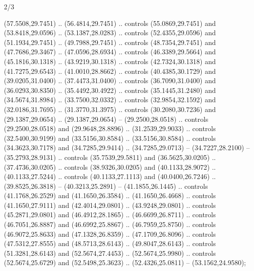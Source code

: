 \begin{flagdescription}{2/3}
\begin{scope}[xshift=0.3333\flaglength,yshift=0.5\flagwidth,scale=\flagwidth/711.3]
\begin{scope}
    (57.5508,29.7451) .. (56.4814,29.7451) .. controls (55.0869,29.7451) and
    (53.8418,29.0596) .. (53.1387,28.0283) .. controls (52.4355,29.0596) and
    (51.1934,29.7451) .. (49.7988,29.7451) .. controls (48.7354,29.7451) and
    (47.7686,29.3467) .. (47.0596,28.6934) .. controls (46.3389,29.5664) and
    (45.1816,30.1318) .. (43.9219,30.1318) .. controls (42.7324,30.1318) and
    (41.7275,29.6543) .. (41.0010,28.8662) .. controls (40.4385,30.1729) and
    (39.0205,31.0400) .. (37.4473,31.0400) .. controls (36.7090,31.0400) and
    (36.0293,30.8350) .. (35.4492,30.4922) .. controls (35.1445,31.2480) and
    (34.5674,31.8984) .. (33.7500,32.0332) .. controls (32.9854,32.1592) and
    (32.0186,31.7695) .. (31.3770,31.3975) .. controls (30.2080,30.7236) and
    (29.1387,29.0654) .. (29.1387,29.0654) -- (29.2500,28.0518) .. controls
    (29.2500,28.0518) and (29.9648,28.8896) .. (31.2539,29.9033) .. controls
    (32.5400,30.9199) and (33.5156,30.8584) .. (33.5156,30.8584) .. controls
    (34.3623,30.7178) and (34.7285,29.9414) .. (34.7285,29.0713) --
    (34.7227,28.2100) -- (35.2793,28.9131) .. controls (35.7539,29.5811) and
    (36.5625,30.0205) .. (37.4736,30.0205) .. controls (38.9326,30.0205) and
    (40.1133,28.9072) .. (40.1133,27.5244) .. controls (40.1133,27.1113) and
    (40.0400,26.7246) .. (39.8525,26.3818) -- (40.3213,25.2891) --
    (41.1855,26.1445) .. controls (41.1768,26.2529) and (41.1650,26.3584) ..
    (41.1650,26.4668) .. controls (41.1650,27.9111) and (42.4014,29.0801) ..
    (43.9248,29.0801) .. controls (45.2871,29.0801) and (46.4912,28.1865) ..
    (46.6699,26.8711) .. controls (46.7051,26.8887) and (46.6992,25.8867) ..
    (46.7959,25.8750) .. controls (46.9072,25.8633) and (47.1328,26.8359) ..
    (47.1709,26.8096) .. controls (47.5312,27.8555) and (48.5713,28.6143) ..
    (49.8047,28.6143) .. controls (51.3281,28.6143) and (52.5674,27.4453) ..
    (52.5674,25.9980) .. controls (52.5674,25.6729) and (52.5498,25.3623) ..
    (52.4326,25.0811) -- (53.1562,24.9580);


\end{scope}
\end{scope}
\end{flagdescription}
